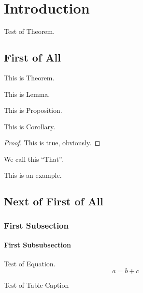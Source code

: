 \documentclass[a4j,12pt,oneside,openany,english,dvipdfmx]{jsbook}
\begin{document}
\chapter{Introduction}
Test of Theorem.

\section{First of All}

\begin{theorem}
This is Theorem.
\end{theorem}

\begin{lemma}
This is Lemma.
\end{lemma}

\begin{proposition}
This is Proposition.
\end{proposition}

\begin{corollary}
This is Corollary.
\end{corollary}

\begin{proof}
This is true, obviously.
\end{proof}

\begin{definition}
We call this ``That''.
\end{definition}

\begin{example}
This is an example.
\end{example}

\section{Next of First of All}
\subsection{First Subsection}
\subsubsection{First Subsubsection}

Test of Equation.
\begin{equation}
	a = b + c
\end{equation}

\begin{table}
	\caption{Test of Table Caption}
\end{table}
\end{document}
